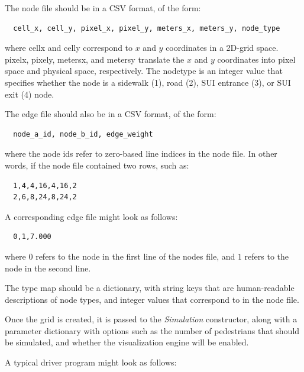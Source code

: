 \documentclass[12pt]{article}
\begin{document}
The node file should be in a CSV format, of the form:

\begin{lstlisting}
  cell_x, cell_y, pixel_x, pixel_y, meters_x, meters_y, node_type
\end{lstlisting}

where cell\textunderscore x and cell\textunderscore y correspond to $x$ and $y$
coordinates in a 2D-grid space. pixel\textunderscore x, pixel\textunderscore y,
meters\textunderscore x, and meters\textunderscore y translate the $x$ and $y$
coordinates into pixel space and physical space, respectively. The
node\textunderscore type is an integer value that specifies whether the node
is a sidewalk (1), road (2), SUI entrance (3), or SUI exit (4) node.

The edge file should also be in a CSV format, of the form:

\begin{lstlisting}
  node_a_id, node_b_id, edge_weight
\end{lstlisting}

where the node ids refer to zero-based line indices in the node file. In other
words, if the node file contained two rows, such as:

\begin{lstlisting}
  1,4,4,16,4,16,2
  2,6,8,24,8,24,2
\end{lstlisting}

A corresponding edge file might look as follows:

\begin{lstlisting}
  0,1,7.000
\end{lstlisting}

where $0$ refers to the node in the first line of the nodes file, and $1$ refers
to the node in the second line.

The type map should be a dictionary, with string keys that are human-readable
descriptions of node types, and integer values that correspond to %
in the node file.

Once the grid is created, it is passed to the \textit{Simulation} constructor,
along with a parameter dictionary with options such as the number of pedestrians
that should be simulated, and whether the visualization engine will be enabled.

A typical driver program might look as follows:
\end{document}

